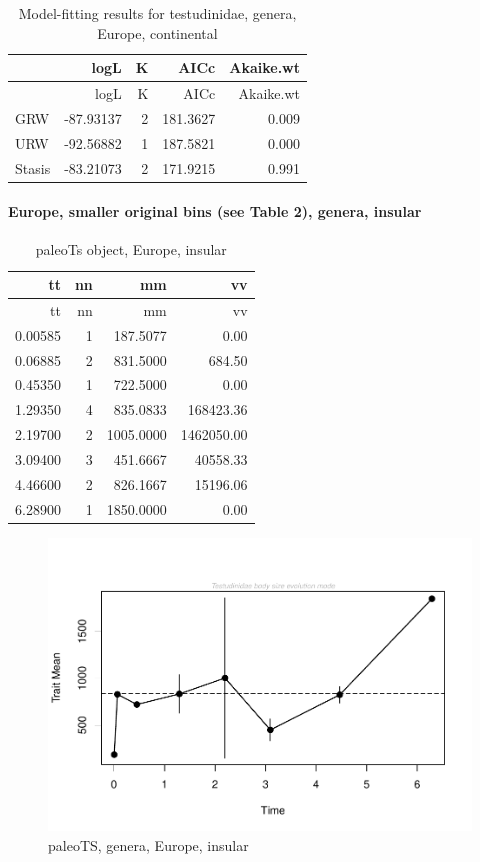 \documentclass[]{article}
\let\oldparagraph\paragraph
\renewcommand{\paragraph}[1]{\oldparagraph{#1}\mbox{}}
\begin{document}
\begin{longtable}[]{@{}lrrrr@{}}
\caption{Model-fitting results for testudinidae, genera, Europe,
continental}\tabularnewline
\toprule
& logL & K & AICc & Akaike.wt\tabularnewline
\midrule
\endfirsthead
\toprule
& logL & K & AICc & Akaike.wt\tabularnewline
\midrule
\endhead
GRW & -87.93137 & 2 & 181.3627 & 0.009\tabularnewline
URW & -92.56882 & 1 & 187.5821 & 0.000\tabularnewline
Stasis & -83.21073 & 2 & 171.9215 & 0.991\tabularnewline
\bottomrule
\end{longtable}

\newpage

\paragraph{Europe, smaller original bins (see Table 2), genera,
insular}\label{europe-smaller-original-bins-see-table-2-genera-insular}

\begin{longtable}[]{@{}rrrr@{}}
\caption{paleoTs object, Europe, insular}\tabularnewline
\toprule
tt & nn & mm & vv\tabularnewline
\midrule
\endfirsthead
\toprule
tt & nn & mm & vv\tabularnewline
\midrule
\endhead
0.00585 & 1 & 187.5077 & 0.00\tabularnewline
0.06885 & 2 & 831.5000 & 684.50\tabularnewline
0.45350 & 1 & 722.5000 & 0.00\tabularnewline
1.29350 & 4 & 835.0833 & 168423.36\tabularnewline
2.19700 & 2 & 1005.0000 & 1462050.00\tabularnewline
3.09400 & 3 & 451.6667 & 40558.33\tabularnewline
4.46600 & 2 & 826.1667 & 15196.06\tabularnewline
6.28900 & 1 & 1850.0000 & 0.00\tabularnewline
\bottomrule
\end{longtable}

\begin{figure}[htbp]
\centering
\includegraphics{MA_JJ_files/figure-latex/pTSEuI-1.pdf}
\caption{paleoTS, genera, Europe, insular}
\end{figure}
\end{document}
